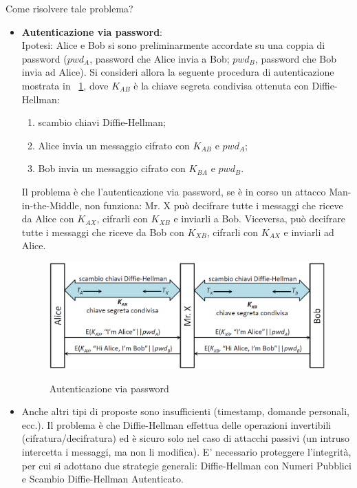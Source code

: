 Come risolvere tale problema? 
\begin{itemize}
\item \textbf{Autenticazione via password}: \\ Ipotesi: Alice e Bob si sono preliminarmente accordate su una coppia di password ($pwd_{A}$, password che Alice invia a Bob; $pwd_{B}$, password che Bob invia ad Alice). Si consideri allora la seguente procedura di autenticazione mostrata in \figurename~\ref{fig:aut_via_pwd}, dove $K_{AB}$ è la chiave segreta condivisa ottenuta con Diffie-Hellman: \begin{enumerate}
\item scambio chiavi Diffie-Hellman;
\item Alice invia un messaggio cifrato con $K_{AB}$ e $pwd_{A}$;
\item Bob invia un messaggio cifrato con $K_{BA}$ e $pwd_{B}$.
\end{enumerate}
Il problema è che l'autenticazione via password, se è in corso un attacco Man-in-the-Middle, non funziona: Mr. X può decifrare tutte i messaggi che riceve da Alice con $K_{AX}$, cifrarli con $K_{XB}$ e inviarli a Bob. Viceversa, può decifrare tutte i messaggi che riceve da Bob con $K_{XB}$, cifrarli con $K_{AX}$ e inviarli ad Alice.
\begin{figure}[htbp]
	\centering%
	\subfigure%
	{\includegraphics[scale=0.5, keepaspectratio]{Immagini/chiave_pubblica/DiffieHellman_passauth.png}}
	\caption{Autenticazione via password}
	\label{fig:aut_via_pwd}
	\end{figure}
\item Anche altri tipi di proposte sono insufficienti (timestamp, domande personali, ecc.). Il problema è che Diffie-Hellman effettua delle operazioni invertibili (cifratura/decifratura) ed è sicuro solo nel caso di attacchi passivi (un intruso intercetta i messaggi, ma non li modifica). E' necessario proteggere l'integrità, per cui si adottano due strategie generali: Diffie-Hellman con Numeri Pubblici e Scambio Diffie-Hellman Autenticato.	
\end{itemize}

